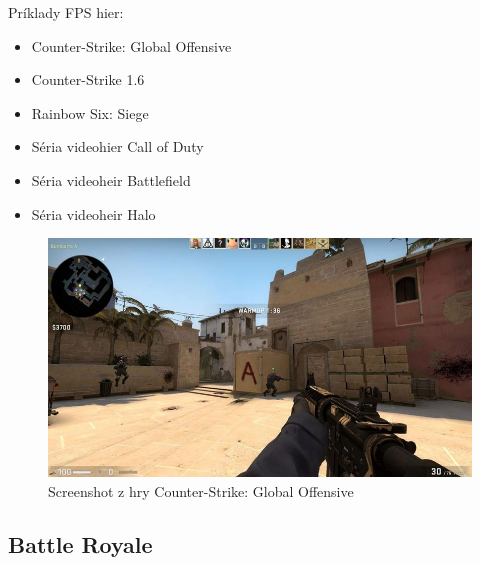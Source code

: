 \documentclass[10pt,oneside,slovak,a4paper]{article}
\begin{document}
Príklady FPS hier:
\begin{itemize}
\item Counter-Strike: Global Offensive
\item Counter-Strike 1.6
\item Rainbow Six: Siege
\item Séria videohier Call of Duty
\item Séria videoheir Battlefield
\item Séria videoheir Halo
\end{itemize}

\begin{figure}[ht]
\centering
\includegraphics[scale=0.15]{csgo.jpg}
\caption{Screenshot z hry Counter-Strike: Global Offensive}
\label{f:csgo}
\end{figure}

\subsection{Battle Royale} \label{zanre:battleroyale}
\end{document}
